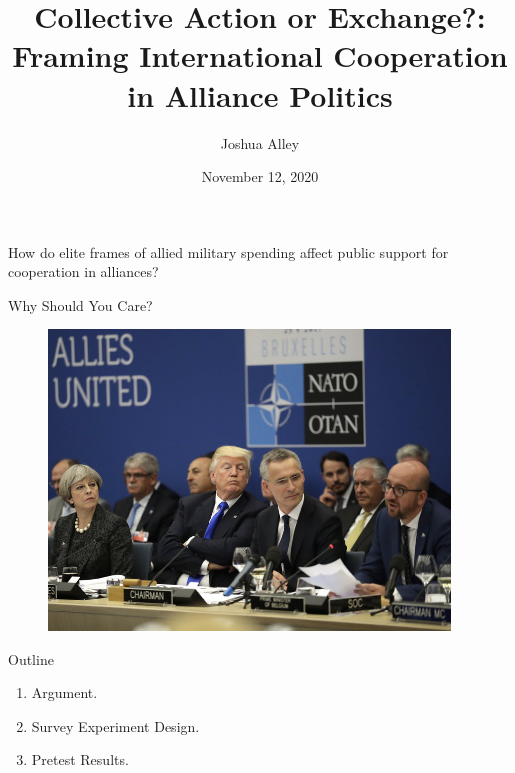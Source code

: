 \documentclass[12pt]{beamer}
\title{Collective Action or Exchange?: Framing International Cooperation in Alliance Politics}
\date{November 12, 2020}
\author{Joshua Alley}
\institute{University of Virginia}
\begin{document}
 \maketitle



 \begin{frame}[standout]

How do elite frames of allied military spending affect public support for cooperation in alliances? 

 \end{frame}
 


\begin{frame}{Why Should You Care?}

\begin{figure}[htbp]
		\includegraphics[width=0.95\textwidth]{trump-nato.jpg}
	\label{fig:trump-nato}
\end{figure}


\end{frame}


\begin{frame}{Outline}

\pause
\begin{enumerate}
\item Argument.
\pause
\item Survey Experiment Design. 
\pause
\item Pretest Results. 
\end{enumerate}


\end{frame}
 
\end{document}
